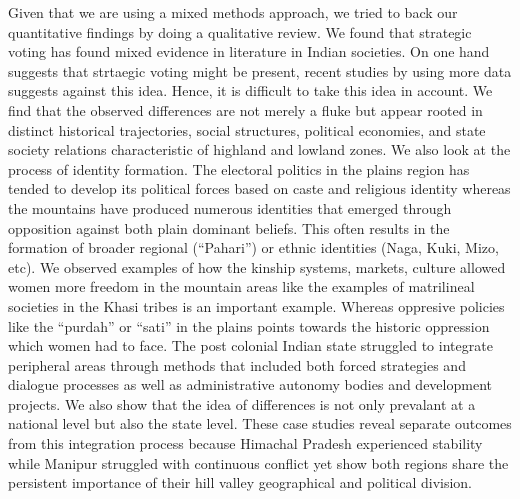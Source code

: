 Given that we are using a mixed methods approach, we tried to back our quantitative findings by doing a qualitative review. We found that strategic voting has found mixed evidence in literature in Indian societies. On one hand \cite{choi2009strategic} suggests that strtaegic voting might be present, recent studies by \cite{ziegfeld2021accounts} using more data  suggests against this idea. Hence, it is difficult to take this idea in account. We find that the observed differences are not merely a fluke but appear rooted in distinct historical trajectories, social structures, political economies, and state society relations characteristic of highland and lowland zones.  We also look at the process of identity formation. The electoral politics in the plains region has tended to develop its political forces based on caste and religious identity whereas the mountains have produced numerous identities that emerged through opposition against both plain dominant beliefs. This often results in the formation of broader regional (``Pahari'') or ethnic identities (Naga, Kuki, Mizo, etc). We observed examples of how the kinship systems, markets, culture allowed women more freedom in the mountain areas like the examples of matrilineal societies in the Khasi tribes is an important example. Whereas oppresive policies like the ``purdah'' or ``sati'' in the plains points towards the historic oppression which women had to face.  The post colonial Indian state struggled to integrate peripheral areas through methods that included both forced strategies and dialogue processes as well as administrative autonomy bodies and development projects. We also show that the idea of differences is not only prevalant at a national level but also the state level. These case studies reveal separate outcomes from this integration process because Himachal Pradesh experienced stability while Manipur struggled with continuous conflict yet show both regions share the persistent importance of their hill valley geographical and political division.


